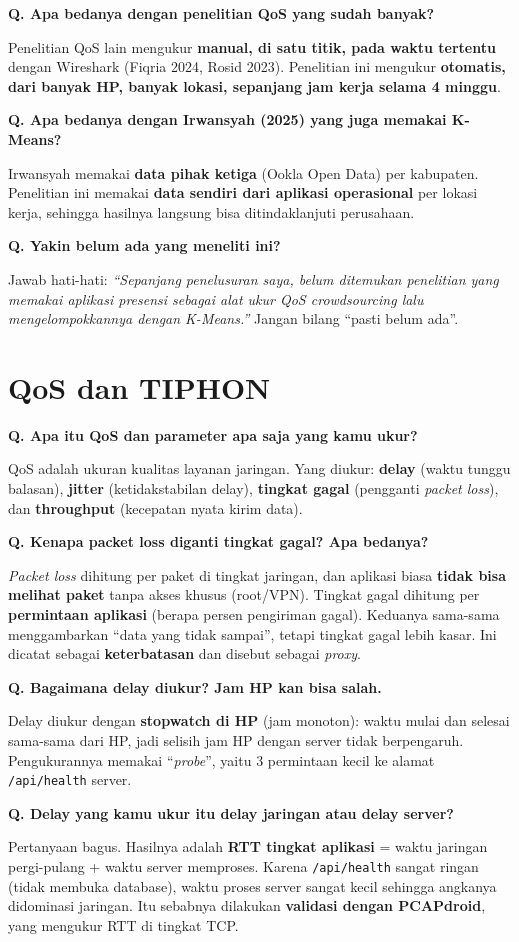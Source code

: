 \documentclass[11pt,a4paper]{article}
\newcounter{q}
\newcommand{\tanya}[2]{\stepcounter{q}%
\par\vspace{6pt}\noindent\colorbox{band}{\parbox{\dimexpr\linewidth-2\fboxsep}{\textbf{Q\arabic{q}. #1}}}\par\vspace{2pt}#2\par}
\begin{document}
\tanya{Apa bedanya dengan penelitian QoS yang sudah banyak?}{Penelitian QoS lain mengukur \textbf{manual, di satu titik, pada waktu tertentu} dengan Wireshark (Fiqria 2024, Rosid 2023). Penelitian ini mengukur \textbf{otomatis, dari banyak HP, banyak lokasi, sepanjang jam kerja selama 4 minggu}.}

\tanya{Apa bedanya dengan Irwansyah (2025) yang juga memakai K-Means?}{Irwansyah memakai \textbf{data pihak ketiga} (Ookla Open Data) per kabupaten. Penelitian ini memakai \textbf{data sendiri dari aplikasi operasional} per lokasi kerja, sehingga hasilnya langsung bisa ditindaklanjuti perusahaan.}

\tanya{Yakin belum ada yang meneliti ini?}{Jawab hati-hati: \textit{``Sepanjang penelusuran saya, belum ditemukan penelitian yang memakai aplikasi presensi sebagai alat ukur QoS crowdsourcing lalu mengelompokkannya dengan K-Means.''} Jangan bilang ``pasti belum ada''.}

\section{QoS dan TIPHON}

\tanya{Apa itu QoS dan parameter apa saja yang kamu ukur?}{QoS adalah ukuran kualitas layanan jaringan. Yang diukur: \textbf{delay} (waktu tunggu balasan), \textbf{jitter} (ketidakstabilan delay), \textbf{tingkat gagal} (pengganti \textit{packet loss}), dan \textbf{throughput} (kecepatan nyata kirim data).}

\tanya{Kenapa packet loss diganti tingkat gagal? Apa bedanya?}{\textit{Packet loss} dihitung per paket di tingkat jaringan, dan aplikasi biasa \textbf{tidak bisa melihat paket} tanpa akses khusus (root/VPN). Tingkat gagal dihitung per \textbf{permintaan aplikasi} (berapa persen pengiriman gagal). Keduanya sama-sama menggambarkan ``data yang tidak sampai'', tetapi tingkat gagal lebih kasar. Ini dicatat sebagai \textbf{keterbatasan} dan disebut sebagai \textit{proxy}.}

\tanya{Bagaimana delay diukur? Jam HP kan bisa salah.}{Delay diukur dengan \textbf{stopwatch di HP} (jam monoton): waktu mulai dan selesai sama-sama dari HP, jadi selisih jam HP dengan server tidak berpengaruh. Pengukurannya memakai ``\textit{probe}'', yaitu 3 permintaan kecil ke alamat \texttt{/api/health} server.}

\tanya{Delay yang kamu ukur itu delay jaringan atau delay server?}{Pertanyaan bagus. Hasilnya adalah \textbf{RTT tingkat aplikasi} = waktu jaringan pergi-pulang + waktu server memproses. Karena \texttt{/api/health} sangat ringan (tidak membuka database), waktu proses server sangat kecil sehingga angkanya didominasi jaringan. Itu sebabnya dilakukan \textbf{validasi dengan PCAPdroid}, yang mengukur RTT di tingkat TCP.}
\end{document}
